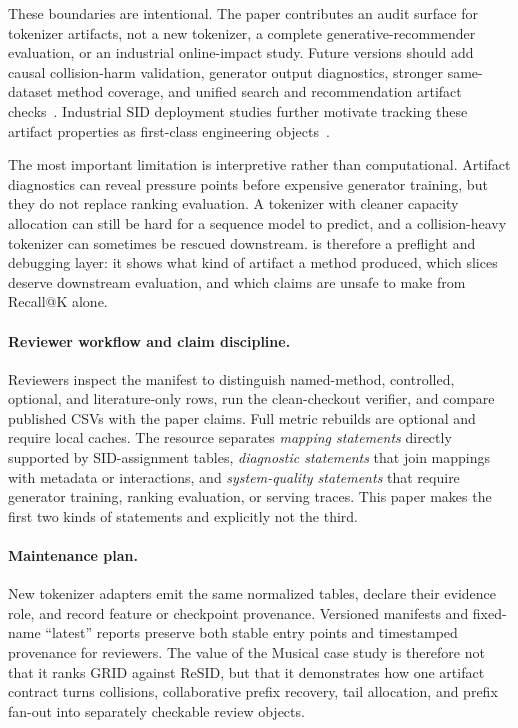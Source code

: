 These boundaries are intentional. The paper contributes an audit surface for
tokenizer artifacts, not a new \sid tokenizer, a complete
generative-recommender evaluation, or an industrial online-impact study.
Future versions should add causal collision-harm validation, generator output
diagnostics, stronger same-dataset method coverage, and unified search and
recommendation artifact checks~\cite{penha2025jointsid}. Industrial SID
deployment studies further motivate tracking these artifact properties as
first-class engineering objects~\cite{ju2026snapchatsid}.

The most important limitation is interpretive rather than computational.
Artifact diagnostics can reveal pressure points before expensive generator
training, but they do not replace ranking evaluation. A tokenizer with cleaner
capacity allocation can still be hard for a sequence model to predict, and a
collision-heavy tokenizer can sometimes be rescued downstream. \tool is
therefore a preflight and debugging layer: it shows what kind of artifact a
method produced, which slices deserve downstream evaluation, and which claims
are unsafe to make from Recall@K alone.

\paragraph{Reviewer workflow and claim discipline.}
Reviewers inspect the manifest to distinguish named-method, controlled,
optional, and literature-only rows, run the clean-checkout verifier, and compare
published CSVs with the paper claims. Full metric rebuilds are optional and
require local caches. The resource separates \emph{mapping statements} directly
supported by SID-assignment tables, \emph{diagnostic statements} that join
mappings with metadata or interactions, and \emph{system-quality statements}
that require generator training, ranking evaluation, or serving traces. This
paper makes the first two kinds of statements and explicitly not the third.

\paragraph{Maintenance plan.}
New tokenizer adapters emit the same normalized tables, declare their evidence
role, and record feature or checkpoint provenance. Versioned manifests and
fixed-name ``latest'' reports preserve both stable entry points and timestamped
provenance for reviewers. The value of the Musical case study is therefore not
that it ranks GRID against ReSID, but that it demonstrates how one artifact
contract turns collisions, collaborative prefix recovery, tail allocation, and
prefix fan-out into separately checkable review objects.
